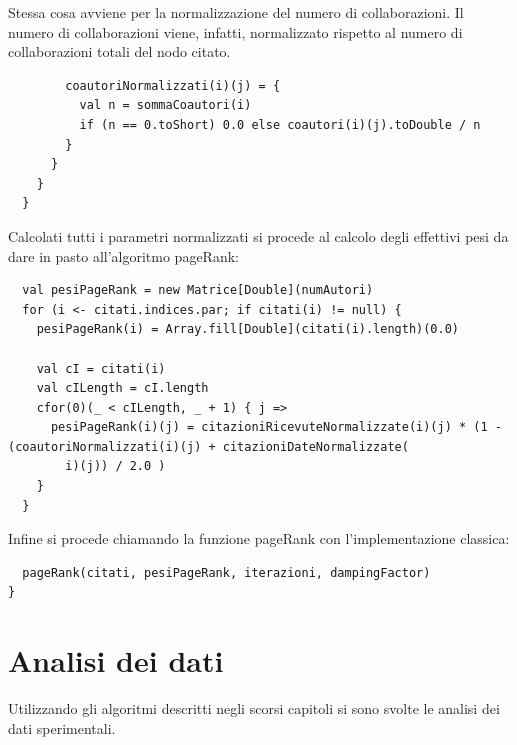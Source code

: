 \documentclass[a4paper, 12pt]{article}
\let\oldsection\section
\renewcommand\section{\clearpage\oldsection}
\begin{document}
Stessa cosa avviene per la normalizzazione del numero di collaborazioni. Il numero di collaborazioni viene, infatti, normalizzato rispetto al numero di collaborazioni totali del nodo citato.
\begin{lstlisting} 
        coautoriNormalizzati(i)(j) = {
          val n = sommaCoautori(i)
          if (n == 0.toShort) 0.0 else coautori(i)(j).toDouble / n
        }
      }
    }
  }
\end{lstlisting}
Calcolati tutti i parametri normalizzati si procede al calcolo degli effettivi pesi da dare in pasto all'algoritmo pageRank:
\begin{lstlisting}
  val pesiPageRank = new Matrice[Double](numAutori)
  for (i <- citati.indices.par; if citati(i) != null) {
    pesiPageRank(i) = Array.fill[Double](citati(i).length)(0.0)

    val cI = citati(i)
    val cILength = cI.length
    cfor(0)(_ < cILength, _ + 1) { j =>
      pesiPageRank(i)(j) = citazioniRicevuteNormalizzate(i)(j) * (1 - (coautoriNormalizzati(i)(j) + citazioniDateNormalizzate(
        i)(j)) / 2.0 )
    }
  }
\end{lstlisting}
Infine si procede chiamando la funzione pageRank con l'implementazione classica:
\begin{lstlisting}
  pageRank(citati, pesiPageRank, iterazioni, dampingFactor)
}
\end{lstlisting}

\section{Analisi dei dati}
Utilizzando gli algoritmi descritti negli scorsi capitoli si sono svolte le analisi dei dati sperimentali.
\end{document}
